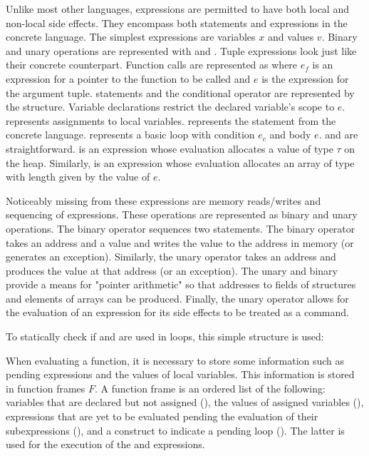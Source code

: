 Unlike most other languages, expressions are permitted to have both local and
non-local side effects. They encompass both statements and expressions in the
concrete language. The simplest expressions are variables $x$ and values $v$.
Binary and unary operations are represented with  and
. Tuple expressions look just like their concrete counterpart.
Function calls are represented as  where $e_f$ is an expression for
a pointer to the function to be called and $e$ is the expression for the
argument tuple.  statements and the conditional operator are
represented by the  structure. Variable declarations
 restrict the declared variable's scope to $e$. 
represents assignments to local variables.  represents the
 statement from the concrete language. 
represents a basic  loop with condition $e_c$ and body $e$.
 and  are straightforward. \allocexp{\tau} is
an expression whose evaluation allocates a value of type $\tau$ on the heap.
Similarly,  is an expression whose evaluation allocates
an array of type \arraytype{\tau} with length given by the value of $e$.

Noticeably missing from these expressions are memory reads/writes and sequencing
of expressions. These operations are represented as binary and unary operations.
The \opseq{} binary operator sequences two statements. The \opwrite{} binary
operator takes an address and a value and writes the value to the address in
memory (or generates an exception). Similarly, the \opread{} unary operator
takes an address and produces the value at that address (or an exception). The
unary  and binary \oparrayindex{} provide a means for "pointer
arithmetic" so that addresses to fields of structures and elements of arrays
can be produced. Finally, the \opign{} unary operator allows for the evaluation
of an expression for its side effects to be treated as a command.

\classe

\classop

To statically check if \breakstm{} and \continue{} are used in loops, this
simple structure is used:

\classL

When evaluating a function, it is necessary to store some information such as
pending expressions and the values of local variables. This information is
stored in function frames $F$. A function frame is an ordered list of the
following: variables that are declared but not assigned (),
the values of assigned variables (), expressions that are yet
to be evaluated pending the evaluation of their subexpressions
(), and a construct to indicate a pending loop
(). The latter is used for the execution of the \breakstm{}
and \continue{} expressions.

